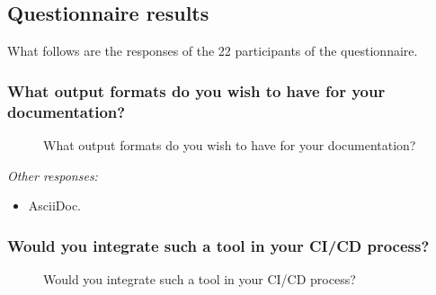 \pagebreak
\subsection{Questionnaire results}

What follows are the responses of the 22 participants of the questionnaire.

\subsubsection*{What output formats do you wish to have for your documentation?}

\begin{figure}[H]
    \centering
    \caption{What output formats do you wish to have for your documentation?}
    \label{fig:qOutputFormats}
\end{figure}

\textit{Other responses:}
\begin{itemize}
    \item AsciiDoc.
\end{itemize}

\subsubsection*{Would you integrate such a tool in your CI/CD process?}

\begin{figure}[H]
    \centering
    \caption{Would you integrate such a tool in your CI/CD process?}
\end{figure}

